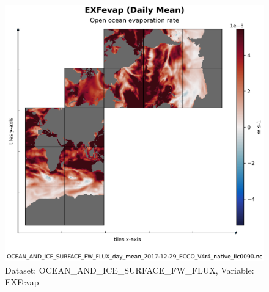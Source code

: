 \begin{figure}[H]
\centering
\includegraphics[scale=0.55]{../images/plots/native_plots/Ocean_and_Sea-Ice_Surface_Freshwater_Fluxes/EXFevap.png}
\caption{Dataset: OCEAN\_AND\_ICE\_SURFACE\_FW\_FLUX, Variable: EXFevap}
\label{tab:table-OCEAN_AND_ICE_SURFACE_FW_FLUX_EXFevap-Plot}
\end{figure}
\pagebreak
